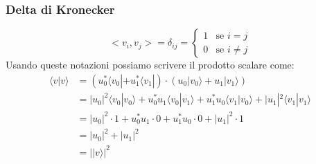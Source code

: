 \documentclass[12pt, a4paper]{report}
\begin{document}
\subsubsection{Delta di Kronecker}
\begin{equation*}
    <v_{i},v_{j}> = \delta_{ij} = \begin{cases}
        1 & \text{se } i=j \\
        0 & \text{se } i\neq j
    \end{cases}
\end{equation*}
Usando queste notazioni possiamo scrivere il prodotto scalare come:
\begin{equation*}
    \begin{split}
        \langle v|v\rangle & = (u_{0}^{*}\langle v_{0}| + u_{1}^{*}\langle v_{1}|)\cdot (u_{0}|v_{0}\rangle + u_{1}|v_{1}\rangle) \\
        & = |u_{0}|^{2} \langle v_{0}|v_{0}\rangle + u_{0}^{*}u_{1}\langle v_{0}|v_{1}\rangle + u_{1}^{*}u_{0}\langle v_{1}|v_{0}\rangle + |u_{1}|^{2}\langle v_{1}|v_{1}\rangle \\
        & = |u_{0}|^{2}\cdot 1 + u_{0}^{*}u_{1} \cdot 0 + u_{1}^{*}u_{0} \cdot 0 + |u_{1}|^{2} \cdot 1 \\
        & = |u_{0}|^{2} + |u_{1}|^{2} \\
        & = | |v\rangle |^{2}
    \end{split}
\end{equation*}
\end{document}
